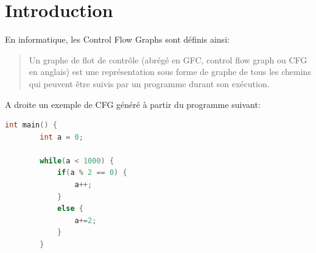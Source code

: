 \section{Introduction}
\begin{multicols}{2}
En informatique, les Control Flow Graphs sont définis ainsi:
\begin{quotation}
    Un graphe de flot de contrôle (abrégé en GFC, control flow graph ou CFG en anglais) est une représentation sous forme de graphe de tous les chemins qui peuvent être suivis par un programme durant son exécution. \cite{wiki:Graphe_de_flot_de_controle}
\end{quotation}
A droite un exemple de CFG généré à partir du programme suivant:
\begin{lstlisting}[language=c, caption={Exemple de programme pour construire un CFG}, captionpos=b]
    int main() {
        int a = 0;
        
        while(a < 1000) {
            if(a % 2 == 0) {
                a++;
            }
            else {
                a+=2;
            }
        }
    

\end{lstlisting}
\end{multicols}
